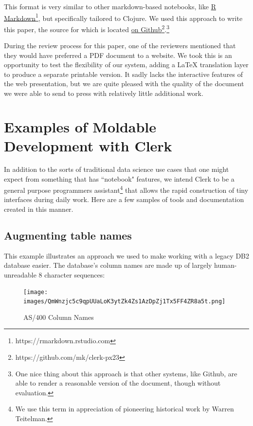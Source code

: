 \documentclass[sigconf,screen,pbalance=true]{acmart}
\begin{document}
This format is very similar to other markdown-based notebooks, like {\href{https://rmarkdown.rstudio.com}{R Markdown}\footnote{https://rmarkdown.rstudio.com}}, but specifically tailored to Clojure. We used this approach to write this paper, the source for which is located {\href{https://github.com/mk/clerk-px23}{on Github}\footnote{https://github.com/mk/clerk-px23}}.\footnote{One nice thing about this approach is that other systems, like Github, are able to render a reasonable version of the document, though without evaluation.}

During the review process for this paper, one of the reviewers mentioned that they would have preferred a PDF document to a website. We took this is an opportunity to test the flexibility of our system, adding a LaTeX translation layer to produce a separate printable version. It sadly lacks the interactive features of the web presentation, but we are quite pleased with the quality of the document we were able to send to press with relatively little additional work.

\hypertarget{examples-of-moldable-development-with-clerk}{%
\section{Examples of Moldable Development with Clerk}\label{examples-of-moldable-development-with-clerk}}

In addition to the sorts of traditional data science use cases that one might expect from something that has ``notebook" features, we intend Clerk to be a general purpose programmer\textquotesingle s assistant\footnote{We use this term in appreciation of pioneering historical work by Warren Teitelman.} that allows the rapid construction of tiny interfaces during daily work. Here are a few samples of tools and documentation created in this manner.

\hypertarget{augmenting-table-names}{%
\subsection{Augmenting table names}\label{augmenting-table-names}}

This example illustrates an approach we used to make working with a legacy DB2 database easier. The database's column names are made up of largely human-unreadable 8 character sequences:

\begin{figure}
\hypertarget{as400-column-names}{%
\centering
\texttt{[image: images/QmWnzjc5c9qpUUaLoK3ytZk4Zs1AzDpZj1Tx5FF4ZR8a5t.png]}
\caption{AS/400 Column Names}\label{as400-column-names}
}
\end{figure}
\end{document}
